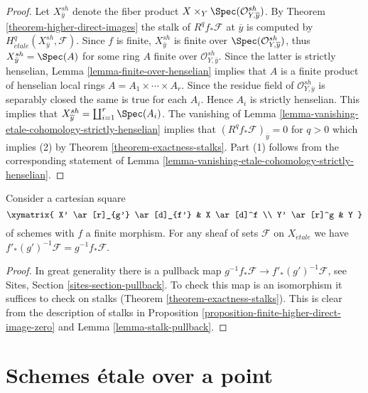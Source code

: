 \begin{proof}
Let $X_{\overline{y}}^{sh}$ denote the fiber product
$X \times_Y \Spec(\mathcal{O}_{Y, \overline{y}}^{sh})$.
By Theorem \ref{theorem-higher-direct-images}
the stalk of $R^qf_*\mathcal{F}$ at $\overline{y}$ is computed by
$H_{\acute{e}tale}^q(X_{\overline{y}}^{sh}, \mathcal{F})$.
Since $f$ is finite, $X_{\bar y}^{sh}$ is finite over
$\Spec(\mathcal{O}_{Y, \overline{y}}^{sh})$, thus
$X_{\bar y}^{sh} = \Spec(A)$ for some ring $A$
finite over $\mathcal{O}_{Y, \bar y}^{sh}$.
Since the latter is strictly henselian,
Lemma \ref{lemma-finite-over-henselian}
implies that $A$ is a finite product of henselian local rings
$A = A_1 \times \cdots \times A_r$. Since the residue field of
$\mathcal{O}_{Y, \overline{y}}^{sh}$ is separably closed the
same is true for each $A_i$. Hence $A_i$ is strictly henselian.
This implies that $X_{\overline{y}}^{sh} = \coprod_{i=1}^r \Spec(A_i)$.
The vanishing of
Lemma \ref{lemma-vanishing-etale-cohomology-strictly-henselian}
implies that $(R^qf_*\mathcal{F})_{\overline{y}} = 0$ for $q > 0$
which implies (2) by Theorem \ref{theorem-exactness-stalks}.
Part (1) follows from the corresponding statement of
Lemma \ref{lemma-vanishing-etale-cohomology-strictly-henselian}.
\end{proof}

\begin{lemma}
\label{lemma-finite-pushforward-commutes-with-base-change}
Consider a cartesian square
$$
\xymatrix{
X' \ar[r]_{g'} \ar[d]_{f'} & X \ar[d]^f \\
Y' \ar[r]^g & Y
}
$$
of schemes with $f$ a finite morphism. For any sheaf of sets
$\mathcal{F}$ on $X_{\acute{e}tale}$ we have
$f'_*(g')^{-1}\mathcal{F} = g^{-1}f_*\mathcal{F}$.
\end{lemma}

\begin{proof}
In great generality there is a pullback map
$g^{-1}f_*\mathcal{F} \to f'_*(g')^{-1}\mathcal{F}$, see
Sites, Section \ref{sites-section-pullback}.
To check this map is an isomorphism it suffices to check
on stalks (Theorem \ref{theorem-exactness-stalks}).
This is clear from the description of stalks
in Proposition \ref{proposition-finite-higher-direct-image-zero} and
Lemma \ref{lemma-stalk-pullback}.
\end{proof}





\section{Schemes \'etale over a point}
\label{section-schemes-etale-point}

